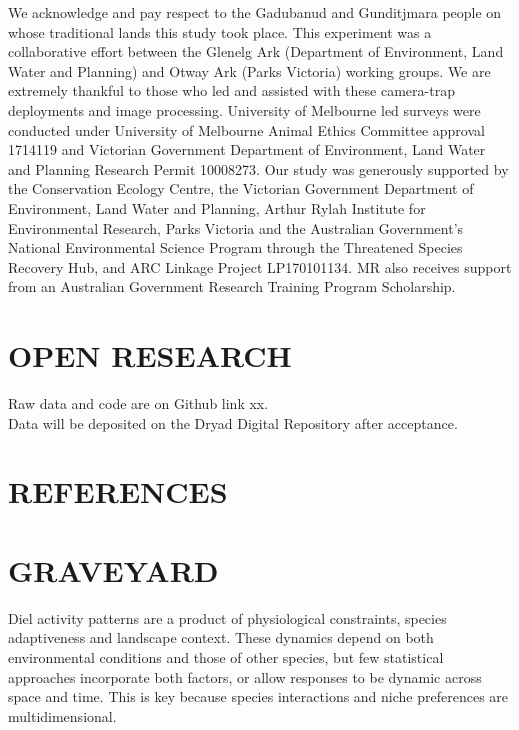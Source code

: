 \documentclass[]{elsarticle} %
\begin{document}
We acknowledge and pay respect to the Gadubanud and Gunditjmara people on whose traditional lands this study took place. This experiment was a collaborative effort between the Glenelg Ark (Department of Environment, Land Water and Planning) and Otway Ark (Parks Victoria) working groups. We are extremely thankful to those who led and assisted with these camera-trap deployments and image processing. University of Melbourne led surveys were conducted under University of Melbourne Animal Ethics Committee approval 1714119 and Victorian Government Department of Environment, Land Water and Planning Research Permit 10008273. Our study was generously supported by the Conservation Ecology Centre, the Victorian Government Department of Environment, Land Water and Planning, Arthur Rylah Institute for Environmental Research, Parks Victoria and the Australian Government's National Environmental Science Program through the Threatened Species Recovery Hub, and ARC Linkage Project LP170101134. MR also receives support from an Australian Government Research Training Program Scholarship.

\hypertarget{open-research}{%
\section{OPEN RESEARCH}\label{open-research}}

Raw data and code are on Github link xx.\\
Data will be deposited on the Dryad Digital Repository after acceptance.

\newpage

\hypertarget{references}{%
\section*{REFERENCES}\label{references}}

\hypertarget{graveyard}{%
\section{GRAVEYARD}\label{graveyard}}

Diel activity patterns are a product of physiological constraints, species adaptiveness and landscape context. These dynamics depend on both environmental conditions and those of other species, but few statistical approaches incorporate both factors, or allow responses to be dynamic across space and time. This is key because species interactions and niche preferences are multidimensional.
\end{document}
